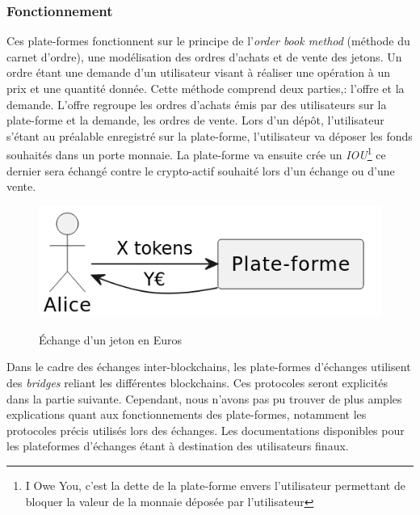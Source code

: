 \subsubsection{Fonctionnement}
Ces plate-formes fonctionnent sur le principe de l'\textit{order book method} (méthode du carnet d'ordre\cite{orderBook}), une modélisation des ordres d'achats et de vente des jetons.
Un ordre étant une demande d'un utilisateur visant à réaliser une opération à un prix et une quantité donnée. 
Cette méthode comprend deux parties,: l'offre et la demande. L'offre regroupe les ordres d'achats émis par des utilisateurs sur la plate-forme et la demande, les ordres de vente.
Lors d'un dépôt, l'utilisateur s'étant au préalable enregistré sur la plate-forme, l'utilisateur va déposer les fonds souhaités dans un porte monnaie. 
La plate-forme va ensuite crée un \textit{IOU}\footnote{I Owe You, c'est la dette de la plate-forme envers l'utilisateur permettant de bloquer la valeur de la monnaie déposée par l'utilisateur\cite{IOU}} 
ce dernier sera échangé contre le crypto-actif souhaité lors d'un échange ou d'une vente. 
\begin{figure}
    \centering
    \includegraphics[scale=0.5]{centralisation/echange.png}
    \label{fig:simplifiedcex}
    \caption{Échange d'un jeton en Euros}
\end{figure}
Dans le cadre des échanges inter-blockchains, les plate-formes d'échanges utilisent des \textit{bridges} reliant les différentes blockchains. 
Ces protocoles seront explicités dans la partie suivante.
Cependant, nous n'avons pas pu trouver de plus amples explications quant aux fonctionnements des plate-formes, notamment les protocoles précis utilisés lors des échanges. 
Les documentations disponibles pour les plateformes d'échanges étant à destination des utilisateurs finaux. 



